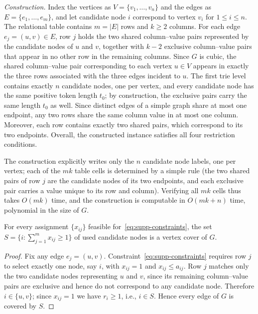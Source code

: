 \emph{Construction.} Index the vertices as
$V=\{v_1,\dots,v_n\}$ and the edges as $E=\{e_1,\dots,e_m\}$, and
let candidate node $i$ correspond to vertex $v_i$ for
$1\leq i\leq n$. The relational table contains $m=|E|$ rows and
$k\geq 2$ columns. For each edge $e_j = (u, v) \in E$, row $j$ holds
the two shared column--value pairs represented by the candidate nodes
of $u$ and $v$, together with $k - 2$ exclusive column--value pairs 
that appear in no other row in the remaining columns. Since $G$ is
cubic, the shared column--value pair corresponding to each vertex
$u \in V$ appears in exactly the three rows associated with the
three edges incident to $u$. The first trie level contains exactly
$n$ candidate nodes, one per vertex, and every candidate node has
the same positive token length $t_0$; by construction, the exclusive pairs carry the same length
$t_0$ as well.
Since distinct edges of a simple graph share at most one
endpoint, any two rows share the same column value in at most one column.
Moreover, each row contains exactly two shared pairs, which correspond to its two endpoints. Overall, the constructed instance satisfies all four restriction conditions. 

The construction explicitly writes only the $n$ candidate
node labels, one per vertex; each of the $mk$ table cells is determined
by a simple rule (the two shared pairs of row $j$ are the candidate
nodes of its two endpoints, and each exclusive pair carries a value
unique to its row and column). Verifying all $mk$ cells thus takes
$O(mk)$ time, and the construction is computable in $O(mk+n)$ time,
polynomial in the size of $G$.

\begin{lemma}
\label{lem:cover}
For every assignment
$\{x_{ij}\}$ feasible for~\eqref{eq:supp-constraints}, the set
$S=\{i:\sum_{j=1}^{m}x_{ij}\geq 1\}$ of used candidate nodes is a vertex
cover of $G$.
\end{lemma}

\begin{proof}
Fix any edge $e_j=(u,v)$. Constraint~\eqref{eq:supp-constraints}
requires row $j$ to select exactly one node, say $i$, with $x_{ij}=1$ and
$x_{ij}\leq a_{ij}$. Row $j$ matches only the two candidate nodes
representing $u$ and $v$, since its remaining column--value pairs are
exclusive and hence do not correspond to any candidate node. Therefore
$i\in\{u,v\}$; since $x_{ij}=1$ we have $r_i\geq 1$, i.e., $i\in S$. Hence
every edge of $G$ is covered by $S$.
\end{proof}

